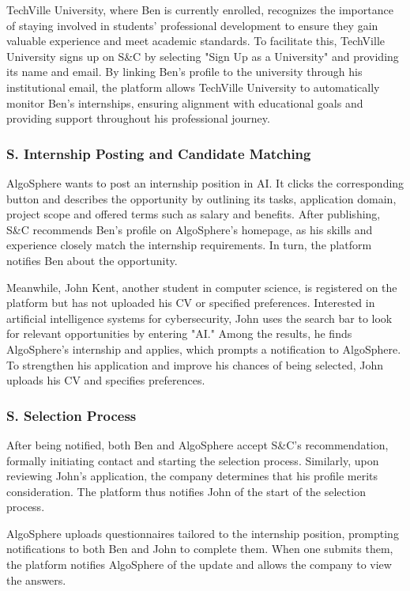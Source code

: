 TechVille University, where Ben is currently enrolled, recognizes the importance of staying involved in students’ professional development to ensure they gain valuable experience and meet academic standards.
To facilitate this, TechVille University signs up on S\&C by selecting "Sign Up as a University" and providing its name and email.
By linking Ben’s profile to the university through his institutional email, the platform allows TechVille University to automatically monitor Ben’s internships, ensuring alignment with educational goals and providing support throughout his professional journey.

\subsubsection*{S\sco. Internship Posting and Candidate Matching}
AlgoSphere wants to post an internship position in AI. It clicks the corresponding button and describes the opportunity by outlining its tasks, application domain, project scope and offered terms such as salary and benefits.
After publishing, S\&C recommends Ben’s profile on AlgoSphere’s homepage, as his skills and experience closely match the internship requirements.
In turn, the platform notifies Ben about the opportunity.

Meanwhile, John Kent, another student in computer science, is registered on the platform but has not uploaded his CV or specified preferences.
Interested in artificial intelligence systems for cybersecurity, John uses the search bar to look for relevant opportunities by entering "AI."
Among the results, he finds AlgoSphere’s internship and applies, which prompts a notification to AlgoSphere.
To strengthen his application and improve his chances of being selected, John uploads his CV and specifies preferences.

\subsubsection*{S\sco. Selection Process}
After being notified, both Ben and AlgoSphere accept S\&C's recommendation, formally initiating contact and starting the selection process.
Similarly, upon reviewing John’s application, the company determines that his profile merits consideration.
The platform thus notifies John of the start of the selection process.

AlgoSphere uploads questionnaires tailored to the internship position, prompting notifications to both Ben and John to complete them.
When one submits them, the platform notifies AlgoSphere of the update and allows the company to view the answers.

